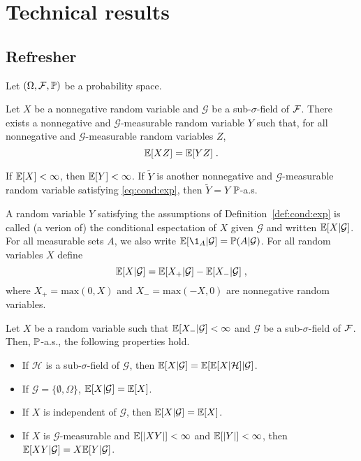 \chapter{Technical results}
\minitoc

\section{Refresher}
Let $(\Omega, \mathcal{F}, \mathbb{P})$ be a probability space.
\begin{shaded}
\begin{definition}
\label{def:cond:exp}
Let $X$ be a nonnegative random variable and $\mathcal{G}$ be a sub-$\sigma$-field of $\mathcal{F}$. There exists a nonnegative and $\mathcal{G}$-measurable random variable $Y$ such that, for  all nonnegative and $\mathcal{G}$-measurable random variables $Z$,
\begin{equation}
\label{eq:cond:exp}
\mathbb{E}[XZ] = \mathbb{E}[YZ]\;.
\end{equation}
\end{definition}
\end{shaded}
\begin{remark}
If $\mathbb{E}[X]<\infty$, then $\mathbb{E}[Y]<\infty$. If $\widetilde Y$ is another nonnegative and $\mathcal{G}$-measurable random variable satisfying \eqref{eq:cond:exp}, then $\widetilde Y = Y$ $\mathbb{P}$-a.s.
\end{remark}
A random variable $Y$ satisfying the assumptions of Definition~\ref{def:cond:exp} is called (a verion of) the conditional espectation of $X$ given $\mathcal{G}$ and written $\mathbb{E}[X|\mathcal{G}]$. For all measurable sets $A$, we also write $\bE[\1_A|\mathcal{G}] = \bP(A|\mathcal{G})$. For all random variables $X$ define
$$
\mathbb{E}[X|\mathcal{G}] = \mathbb{E}[X_+|\mathcal{G}] - \mathbb{E}[X_-|\mathcal{G}]\;,
$$
where $X_+ = \mathrm{max}(0,X)$ and $X_- = \mathrm{max}(-X,0)$ are nonnegative random variables.

\begin{shaded}
\begin{proposition}
\label{prop:cond:exp}
Let $X$ be a random variable such that $\mathbb{E}[X_-|\mathcal{G}]<\infty$ and $\mathcal{G}$ be a sub-$\sigma$-field of $\mathcal{F}$. Then, $\mathbb{P}$-a.s., the following properties hold.
\begin{itemize}
\item  If $\mathcal{H}$ is a sub-$\sigma$-field of $\mathcal{G}$, then $\mathbb{E}[X|\mathcal{G}] = \mathbb{E}[\mathbb{E}[X|\mathcal{H}]|\mathcal{G}]$.
\item If $\mathcal{G} = \{\emptyset,\Omega\}$, $\mathbb{E}[X|\mathcal{G}]=\mathbb{E}[X]$.
\item If $X$ is independent of $\mathcal{G}$, then $\mathbb{E}[X|\mathcal{G}]=\mathbb{E}[X]$.
\item  If $X$ is $\mathcal{G}$-measurable and $\mathbb{E}[|XY|]<\infty$ and $\mathbb{E}[|Y|]<\infty$, then $\mathbb{E}[XY|\mathcal{G}] = X\mathbb{E}[Y|\mathcal{G}]$.
\end{itemize}
\end{proposition}
\end{shaded}




